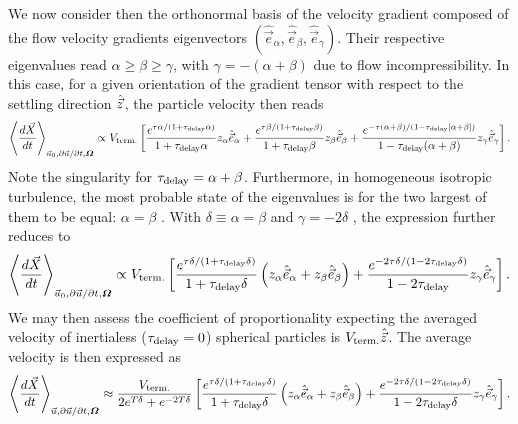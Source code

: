 We now consider then the orthonormal basis of the velocity gradient composed of the flow velocity gradients eigenvectors $(\hat{\vec{e}}_\alpha, \hat{\vec{e}}_\beta, \hat{\vec{e}}_\gamma)$. 
Their respective eigenvalues read $\alpha \ge \beta \ge \gamma$, with $\gamma = -(\alpha + \beta)$ due to flow incompressibility.
In this case, for a given orientation of the gradient tensor with respect to the settling direction $\hat{\vec{z}}$, the particle velocity then reads
\begin{equation}
	\left\langle \frac{d \vec{X}}{dt} \right\rangle_{\vec{u}_0, \partial \vec{u} / \partial t, \boldsymbol{\varOmega}} \propto V_{\mathrm{term.}} \left[ \frac{e^{\tau \alpha/(1 + \tau_{\mathrm{delay}} \alpha)}}{1 + \tau_{\mathrm{delay}} \alpha} z_\alpha \hat{\vec{e}}_{\alpha} + \frac{e^{\tau \beta/(1 + \tau_{\mathrm{delay}} \beta)}}{1 + \tau_{\mathrm{delay}} \beta} z_\beta \hat{\vec{e}}_{\beta} + \frac{e^{-\tau (\alpha + \beta)/(1 - \tau_{\mathrm{delay}} [\alpha + \beta])}}{1 - \tau_{\mathrm{delay}} (\alpha + \beta)} z_\gamma \hat{\vec{e}}_{\gamma} \right].
\end{equation}
Note the singularity for $\tau_{\mathrm{delay}} = \alpha + \beta$.
Furthermore, in homogeneous isotropic turbulence, the most probable state of the eigenvalues is for the two largest of them to be equal: $\alpha = \beta$ \citep{lund1994improved}.
With $\delta \equiv \alpha = \beta$ and $\gamma = -2 \delta$ , the expression further reduces to
\begin{equation}
	\left\langle \frac{d \vec{X}}{dt} \right\rangle_{\vec{u}_0, \partial \vec{u} / \partial t, \boldsymbol{\varOmega}} \propto V_{\mathrm{term.}} \left[ \frac{e^{\tau \delta/(1 + \tau_{\mathrm{delay}} \delta)}}{1 + \tau_{\mathrm{delay}} \delta} \left( z_\alpha \hat{\vec{e}}_{\alpha} + z_\beta \hat{\vec{e}}_{\beta} \right) + \frac{e^{-2 \tau \delta/(1 - 2 \tau_{\mathrm{delay}} \delta)}}{1 - 2 \tau_{\mathrm{delay}}} z_\gamma \hat{\vec{e}}_{\gamma} \right].
\end{equation}
We may then assess the coefficient of proportionality expecting the averaged velocity of inertialess ($\tau_{\mathrm{delay}} = 0$) spherical particles is $V_{\mathrm{term.}} \hat{\vec{z}}$.
The average velocity is then expressed as
\begin{equation}\label{eq:final_settling_sym}
	\left\langle \frac{d \vec{X}}{dt} \right\rangle_{\vec{u}, \partial \vec{u} / \partial t, \boldsymbol{\varOmega}} \approx \frac{V_{\mathrm{term.}}}{2 e^{T \delta} + e^{-2 T \delta}} \left[
		\frac{e^{\tau \delta/(1 + \tau_{\mathrm{delay}} \delta)}}{1 + \tau_{\mathrm{delay}} \delta} \left( z_\alpha \hat{\vec{e}}_{\alpha} + z_\beta \hat{\vec{e}}_{\beta} \right) +
		\frac{e^{-2 \tau \delta/(1 - 2 \tau_{\mathrm{delay}} \delta)}}{1 - 2 \tau_{\mathrm{delay}} \delta} z_\gamma \hat{\vec{e}}_{\gamma}
	 \right].
\end{equation}
